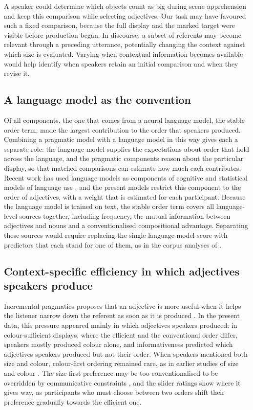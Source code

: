 \documentclass[10pt,a4paper,fleqn]{article}
\begin{document}
A speaker could determine which objects count as big during scene apprehension and keep this comparison while selecting adjectives.
Our task may have favoured such a fixed comparison, because the full display and the marked target were visible before production began.
In discourse, a subset of referents may become relevant through a preceding utterance, potentially changing the context against which size is evaluated.
Varying when contextual information becomes available would help identify when speakers retain an initial comparison and when they revise it.

\subsection{A language model as the convention}

Of all components, the one that comes from a neural language model, the stable order term, made the largest contribution to the order that speakers produced.
Combining a pragmatic model with a language model in this way gives each a separate role: the language model supplies the expectations about order that hold across the language, and the pragmatic components reason about the particular display, so that matched comparisons can estimate how much each contributes.
Recent work has used language models as components of cognitive and statistical models of language use \citep{futrell2023information,franke2024bayesian,tsvilodub2024cognitive}, and the present models restrict this component to the order of adjectives, with a weight that is estimated for each participant.
Because the language model is trained on text, the stable order term covers all language-level sources together, including frequency, the mutual information between adjectives and nouns and a conventionalised compositional advantage.
Separating these sources would require replacing the single language-model score with predictors that each stand for one of them, as in the corpus analyses of \citet{dyer2023evaluating}.

\subsection{Context-specific efficiency in which adjectives speakers produce}

Incremental pragmatics proposes that an adjective is more useful when it helps the listener narrow down the referent as soon as it is produced \citep{fukumura2018ordering,rubio2021wordorder}.
In the present data, this pressure appeared mainly in which adjectives speakers produced: in colour-sufficient displays, where the efficient and the conventional order differ, speakers mostly produced colour alone, and informativeness predicted which adjectives speakers produced but not their order.
When speakers mentioned both size and colour, colour-first ordering remained rare, as in earlier studies of size and colour \citep{danks1972prenominal}.
The size-first preference may be too conventionalised to be overridden by communicative constraints \citep[p.~39]{fukumura2018ordering}, and the slider ratings show where it gives way, as participants who must choose between two orders shift their preference gradually towards the efficient one.
\end{document}
